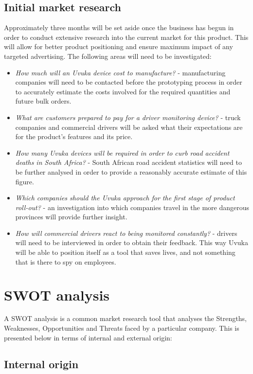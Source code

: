 \subsection{Initial market research}
Approximately three months will be set aside once the business has begun in order to conduct extensive research into the current market for this product. This will allow for better product positioning and ensure maximum impact of any targeted advertising. The following areas will need to be investigated:
\begin{itemize}
	\item \textit{How much will an Uvuka device cost to manufacture?} - manufacturing companies will need to be contacted before the prototyping process in order to accurately estimate the costs involved for the required quantities and future bulk orders.
	\item \textit{What are customers prepared to pay for a driver monitoring device?} - truck companies and commercial drivers will be asked what their expectations are for the product's features and its price.
	\item \textit{How many Uvuka devices will be required in order to curb road accident deaths in South Africa?} - South African road accident statistics will need to be further analysed in order to provide a reasonably accurate estimate of this figure.
	\item \textit{Which companies should the Uvuka approach for the first stage of product roll-out?} - an investigation into which companies travel in the more dangerous provinces will provide further insight.
	\item \textit{How will commercial drivers react to being monitored constantly?} - drivers will need to be interviewed in order to obtain their feedback. This way Uvuka will be able to position itself as a tool that saves lives, and not something that is there to spy on employees.
\end{itemize}

 \section{SWOT analysis}
A SWOT analysis is a common market research tool that analyses the Strengths, Weaknesses, Opportunities and Threats faced by a particular company. This is presented below in terms of internal and external origin:
\pagebreak
\subsection{Internal origin}
